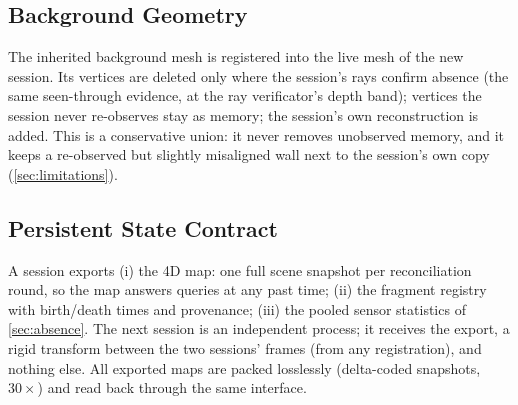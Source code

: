 \subsection{Background Geometry}
\label{sec:background}

The inherited background mesh is registered into the live mesh of the new
session. Its vertices are deleted only where the session's rays confirm absence
(the same seen-through evidence, at the ray verificator's depth band); vertices
the session never re-observes stay as memory; the session's own reconstruction
is added. This is a conservative union: it never removes unobserved memory, and
it keeps a re-observed but slightly misaligned wall next to the session's own
copy (\cref{sec:limitations}).

\subsection{Persistent State Contract}
\label{sec:contract}

A session exports (i) the 4D map: one full scene snapshot per reconciliation
round, so the map answers queries at any past time; (ii) the fragment registry
with birth/death times and provenance; (iii) the pooled sensor statistics of
\cref{sec:absence}. The next session is an independent process; it receives the
export, a rigid transform between the two sessions' frames (from any
registration), and nothing else. All exported maps are packed losslessly
(delta-coded snapshots, $30\times$) and read back through the same interface.

